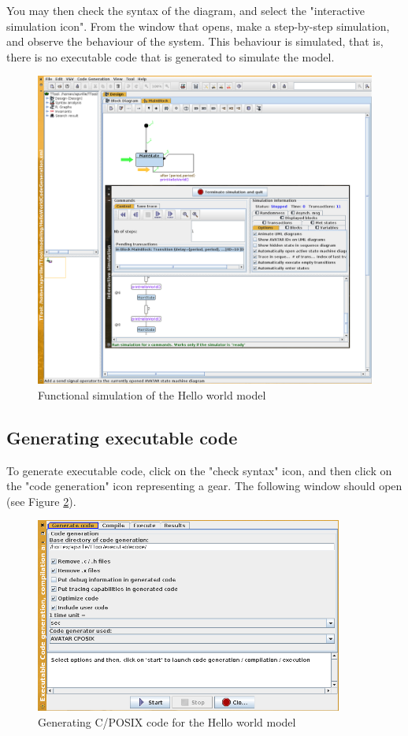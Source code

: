 \documentclass[12pt]{article}
\begin{document}
You may then check the syntax of the diagram, and select the "interactive simulation icon". From the window that opens, make a step-by-step simulation, and observe the behaviour of the system. This behaviour is simulated, that is, there is no executable code that is generated to simulate the model.

\begin{figure}[htbp]
\centering
\includegraphics[width=1\textwidth]{figures/simulationhelloworld}
\caption{Functional simulation of the Hello world model} \label{fig:simuhelloworld}
\end{figure}

\subsection{Generating executable code}
To generate executable code, click on the "check syntax" icon, and then click on the "code generation" icon representing a gear. The following window should open (see Figure \ref{fig:codegenhelloworld}).

\begin{figure}[htbp]
\centering
\includegraphics[width=0.9\textwidth]{figures/codegenhelloworld}
\caption{Generating C/POSIX code for the Hello world model} \label{fig:codegenhelloworld}
\end{figure}
\end{document}
